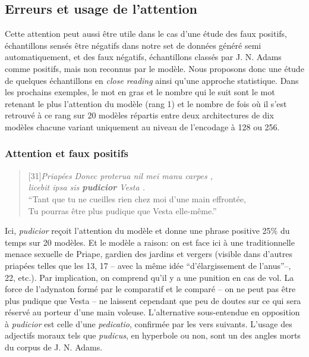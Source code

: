 \subsection{Erreurs et usage de l'attention}

Cette attention peut aussi être utile dans le cas d'une étude des faux positifs, échantillons sensés être négatifs dans notre set de données généré semi automatiquement, et des faux négatifs, échantillons classés par J. N. Adams comme positifs, mais non reconnus par le modèle. Nous proposons donc une étude de quelques échantillons en \textit{close reading} ainsi qu'une approche statistique. Dans les prochains exemples, le mot en gras et le nombre qui le suit sont le mot retenant le plus l'attention du modèle (rang 1) et le nombre de fois où il s'est retrouvé à ce rang sur 20 modèles répartis entre deux architectures de dix modèles chacune variant uniquement au niveau de l'encodage à 128 ou 256.

\subsubsection{Attention et faux positifs}

\begin{quote}[31]{\textit{Priapées}}
    \textit{Donec proterua nil mei manu carpes ,{\\}  licebit ipsa sis \textbf{pudicior} Vesta . } \\
    \enquote{Tant que tu ne cueilles rien chez moi d’une main effrontée, {\\} Tu pourras être plus pudique que Vesta elle-même.}
\end{quote}



Ici, \textit{pudicior} reçoit l'attention du modèle et donne une phrase positive 25\% du temps sur 20 modèles. Et le modèle a raison: on est face ici à une traditionnelle menace sexuelle de Priape, gardien des jardins et vergers (visible dans d'autres priapées telles que les 13, 17 -- avec la même idée ``d'élargissement de l'anus''--, 22, etc.). Par implication, on comprend qu'il y a une punition en cas de vol. La force de l'adynaton formé par le comparatif et le comparé -- on ne peut pas être plus pudique que Vesta -- ne laissent cependant que peu de doutes sur ce qui sera réservé au porteur d'une main voleuse. L'alternative sous-entendue en opposition à \textit{pudicior} est celle d'une \textit{pedicatio}, confirmée par les vers suivants. L'usage des adjectifs moraux tels que \textit{pudicus}, en hyperbole ou non, sont un des angles morts du corpus de J. N. Adams.



